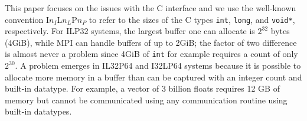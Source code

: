 


This paper focuses on the issues with the C interface and we use the
well-known convention I$n_{I}$L$n_{L}$P$n_{P}$ to refer to the sizes
of the C types \texttt{int}, \texttt{long}, and \texttt{void*}, respectively.
For ILP32 systems, the largest buffer one can allocate is $2^{32}$ bytes (4GiB),
while MPI can handle buffers of up to 2GiB; the factor of two difference is
almost never a problem since 4GiB of \texttt{int} for example requires
a count of only $2^{30}$.
 A problem emerges in IL32P64 and I32LP64 systems because it is possible to allocate
 more memory in a buffer than can be captured with an integer count and built-in datatype.
 For example, a vector of 3 billion floats requires 12 GB of memory but cannot be 
 communicated using any communication routine using built-in datatypes.

